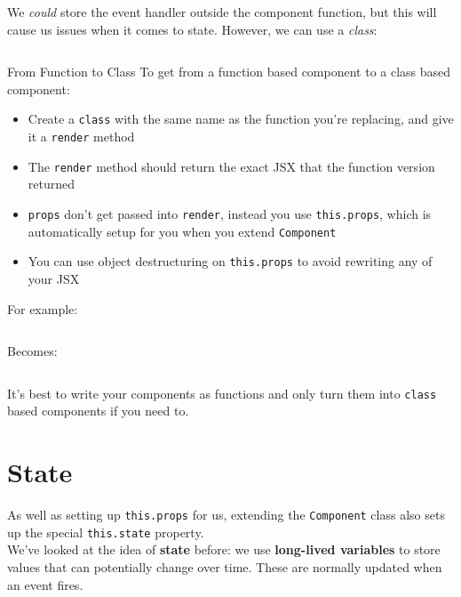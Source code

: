 We \textit{could} store the event handler outside the component function, but this will cause us issues when it comes to state. However, we can use a \textit{class}:

\inputminted{jsx}{04-state/figures/02-class-component.jsx}


\begin{infobox}{From Function to Class}
    To get from a function based component to a class based component:

    \begin{itemize}
        \item Create a \texttt{class} with the same name as the function you're replacing, and give it a \texttt{render} method
        \item The \texttt{render} method should return the exact JSX that the function version returned
        \item \texttt{props} don't get passed into \texttt{render}, instead you use \texttt{this.props}, which is automatically setup for you when you extend \texttt{Component}
        \item You can use object destructuring on \texttt{this.props} to avoid rewriting any of your JSX
    \end{itemize}

    For example:

    \inputminted{jsx}{04-state/figures/03-function-to-class-func.jsx}

    Becomes:

    \inputminted{jsx}{04-state/figures/04-function-to-class-class.jsx}

    It's best to write your components as functions and only turn them into \texttt{class} based components if you need to.
\end{infobox}


\pagebreak


\section{State}

As well as setting up \texttt{this.props} for us, extending the \texttt{Component} class also sets up the special \texttt{this.state} property.
\\

We've looked at the idea of \textbf{state} before: we use \textbf{long-lived variables} to store values that can potentially change over time. These are normally updated when an event fires.
\\

